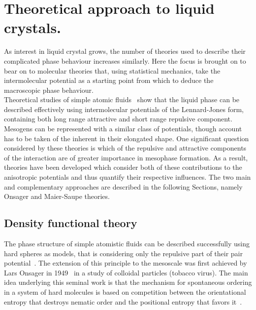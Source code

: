 \section{Theoretical approach to liquid crystals.}


As interest in liquid crystal grows, the number of theories used to describe their
complicated phase behaviour increases similarly. Here the focus is brought on to bear on to molecular
theories that, using statistical mechanics, take the intermolecular potential as a starting point 
from which to deduce the macroscopic phase behaviour.\\
%
Theoretical studies of simple atomic fluids~\cite{theorySimpleLiquids} show that the liquid 
phase can be described effectively using intermolecular potentials of the Lennard-Jones form,
\ie containing both long range attractive and short range repulsive component. Mesogens 
can be represented with a similar class of potentials, though account has to be taken of the
inherent in their elongated shape. One significant question considered by these theories is
which of the repulsive and attractive components of the interaction are of greater importance in
mesophase formation. As a result, theories have been developed which consider both of these
contributions to the anisotropic potentials and thus quantify their respective influences. The two main
and complementary approaches are described in the following Sections, namely Onsager and Maier-Saupe
theories.


\subsection{Density functional theory}

The phase structure of simple atomistic fluids can be described successfully using hard spheres as
models, that is considering only the repulsive part of their pair
potential~\cite{BarkerHenderson76}. The extension of this principle to the mesoscale was
first achieved by Lars Onsager in 1949~\cite{Onsager49} in a study of colloidal particles
(tobacco virus). The main idea underlying this seminal work is that the mechanism for spontaneous 
ordering in a system of hard molecules is based on competition between the orientational entropy that
destroys nematic order and the positional entropy that favors it~\cite{deGennes}.\\

